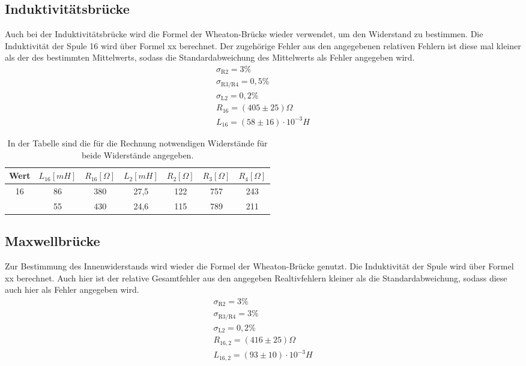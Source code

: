 \documentclass[titlepage = firstcover]{scrartcl}
\begin{document}
  \subsection{Induktivitätsbrücke}
  Auch bei der Induktivitätsbrücke wird die Formel der Wheaton-Brücke wieder verwendet, um den Widerstand zu bestimmen. Die Induktivität der Spule 16 wird
  über Formel xx berechnet. Der zugehörige Fehler aus den angegebenen relativen Fehlern ist diese mal kleiner als der 
  des bestimmten Mittelwerts, sodass die Standardabweichung des Mittelwerts als Fehler angegeben wird.
  \begin{align*}
    \sigma_{\text{R2}} = 3 \% \\
    \sigma_{\text{R3/R4}} = 0,5 \% \\
    \sigma_{\text{L2}} = 0,2 \% \\
    R_{16} = (405 \pm 25) \Omega\\
    L_{16} = (58 \pm 16) \cdot 10^{-3} H
  \end{align*}

  \begin{table}[h]
    \centering
    \caption{In der Tabelle sind die für die Rechnung notwendigen Widerstände für beide Widerstände angegeben.}
    \label{tab:Indu}
    \begin{tabular}{c c c c c c c}
      \toprule
      {Wert} & {$L_{\text{16}} [mH]$} & {$R_{\text{16}} [\Omega]$} & {$L_{\text{2}} [mH]$} & {$R_{\text{2}} [\Omega]$} & {$R_{\text{3}} [\Omega]$} & {$R_{\text{4}} [\Omega]$} \\
      \midrule 
      16 & 86 & 380 & 27,5 & 122 & 757 & 243  \\
       & 55 & 430 & 24,6 & 115 & 789 & 211 \\
      \bottomrule
    \end{tabular}
  \end{table}

  \subsection{Maxwellbrücke}
  Zur Bestimmung des Innenwiderstands wird wieder die Formel der Wheaton-Brücke genutzt. Die Induktivität der Spule wird über Formel xx berechnet. Auch hier ist
  der relative Gesamtfehler aus den angegeben Realtivfehlern kleiner als die Standardabweichung, sodass diese auch hier als Fehler angegeben wird. 
  \begin{align*}
    \sigma_{\text{R2}} = 3 \% \\
    \sigma_{\text{R3/R4}} = 3 \% \\
    \sigma_{\text{L2}} = 0,2 \% \\
    R_{16,2} = (416 \pm 25) \Omega\\
    L_{16,2} = (93 \pm 10) \cdot 10^{-3} H
  \end{align*}
\end{document}
